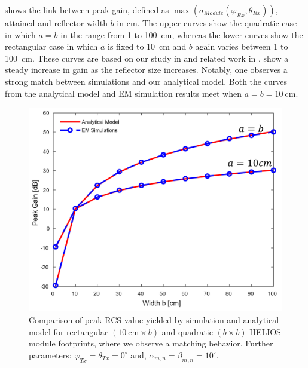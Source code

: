  shows the link between peak gain, defined as $\max\left(\sigma_{Module}\left(\varphi_{Rx}, \theta_{Rx}\right)\right)$, attained and reflector width $b$ in \si{\centi\meter}. The upper curves show the quadratic case in which $a=b$ in the range from \num{1} to \SI{100}{\centi\meter}, whereas the lower curves show the rectangular case in which $a$ is fixed to \SI{10}{\centi\meter} and $b$ again varies between \num{1} to \SI{100}{\centi\meter}. These curves are based on our study in  and related work in , show a steady increase in gain as the reflector size increases. Notably, one observes a strong match between simulations and our analytical model. Both the curves from the analytical model and EM simulation results meet when $a=b=\SI{10}{\centi\meter}$.
\begin{figure}[H]
	\centering
	\includegraphics[width=0.7\linewidth]{images/Section 3 Images/a_b_sweep}
	\caption{Comparison of peak RCS value yielded by simulation and analytical model for rectangular $(\SI{10}{\centi\meter} \times b)$ and quadratic $(b \times b)$ HELIOS module footprints, where we observe a matching behavior. Further parameters: $\varphi_{Tx}=\theta_{Tx} = 0^\circ$ and, $\alpha_{m,n}=\beta_{m,n}=10^\circ$.}
	\label{fig:absweep}
\end{figure}


